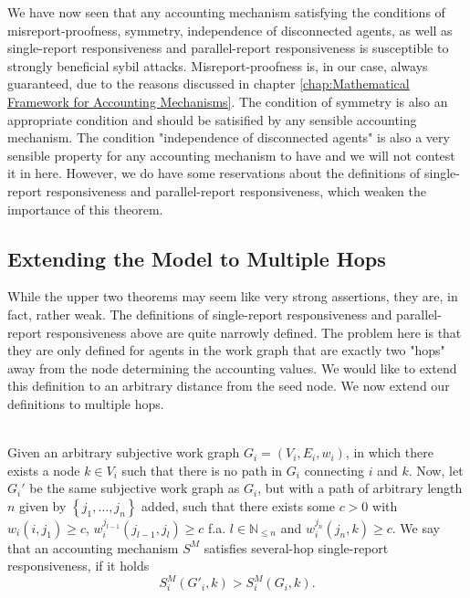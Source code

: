 \noindent{}We have now seen that any accounting mechanism satisfying the conditions of misreport-proofness, symmetry, independence of disconnected agents, as well as single-report responsiveness and parallel-report responsiveness is susceptible to strongly beneficial sybil attacks. Misreport-proofness is, in our case, always guaranteed, due to the reasons discussed in chapter \ref{chap:Mathematical Framework for Accounting Mechanisms}. The condition of symmetry is also an appropriate condition and should be satisified by any sensible accounting mechanism. The condition "independence of disconnected agents" is also a very sensible property for any accounting mechanism to have and we will not contest it in here. However, we do have some reservations about the definitions of single-report responsiveness and parallel-report responsiveness, which weaken the importance of this theorem. \vspace{1em}\\


\subsection{Extending the Model to Multiple Hops}
\label{subsec:Extending the Model to Multiple Hops}
\noindent{}While the upper two theorems may seem like very strong assertions, they are, in fact, rather weak. The definitions of single-report responsiveness and parallel-report responsiveness above are quite narrowly defined. The problem here is that they are only defined for agents in the work graph that are exactly two "hops" away from the node determining the accounting values. We would like to extend this definition to an arbitrary distance from the seed node. We now extend our definitions to multiple hops.\vspace{1em}\\

\begin{definition}\ \\
\label{def:Several-Hop Single-report Responsiveness}
Given an arbitrary subjective work graph $G_i=(V_i,E_i,w_i)$, in which there exists a node $k\in{}V_i$ such that there is no path in $G_i$ connecting $i$ and $k$. Now, let $G_i'$ be the same subjective work graph as $G_i$, but with a path of arbitrary length $n$ given by $\left\lbrace{}j_1,\ldots,j_n\right\rbrace$ added, such that there exists some $c>0$ with $w_i(i,j_1)\geq{}c$, $w_i^{j_{l-1}}(j_{l-1},j_l)\geq{}c$ f.a. $l\in\mathbb{N}_{\leq{}n}$ and $w_i^{j_n}(j_n,k)\geq{}c$. We say that an accounting mechanism $S^M$ satisfies several-hop single-report responsiveness, if it holds
\[
S^M_i(G'_i,k)>S^M_i(G_i,k).
\]
\end{definition}

